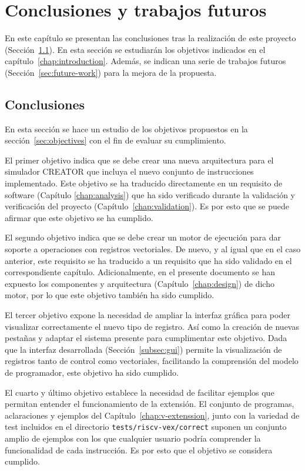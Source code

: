 \chapter{Conclusiones y trabajos futuros}\label{chap:conclusions}
En este capítulo se presentan las conclusiones tras la realización de este proyecto (Sección~\ref{sec:conclussions}). En esta sección se estudiarán los objetivos indicados en el capítulo~\ref{chap:introduction}. Además, se indican una serie de trabajos futuros (Sección~\ref{sec:future-work}) para la mejora de la propuesta.

\section{Conclusiones}\label{sec:conclussions}
En esta sección se hace un estudio de los objetivos propuestos en la sección~\ref{sec:objectives} con el fin de evaluar su cumplimiento.

El primer objetivo indica que se debe crear una nueva arquitectura para el simulador CREATOR que incluya el nuevo conjunto de instrucciones implementado. Este objetivo se ha traducido directamente en un requisito de software (Capítulo \ref{chap:analysis}) que ha sido verificado durante la validación y verificación del proyecto (Capítulo~\ref{chap:validation}). Es por esto que se puede afirmar que este objetivo se ha cumplido.

El segundo objetivo indica que se debe crear un motor de ejecución para dar soporte a operaciones con registros vectoriales. De nuevo, y al igual que en el caso anterior, este requisito se ha traducido a un requisito que ha sido validado en el correspondiente capítulo. Adicionalmente, en el presente documento se han expuesto los componentes y arquitectura (Capítulo~\ref{chap:design}) de dicho motor, por lo que este objetivo también ha sido cumplido.

El tercer objetivo expone la necesidad de ampliar la interfaz gráfica para poder visualizar correctamente el nuevo tipo de registro. Así como la creación de nuevas pestañas y adaptar el sistema presente para cumplimentar este objetivo. Dada que la interfaz desarrollada (Sección~\ref{subsec:gui}) permite la visualización de registros tanto de control como vectoriales, facilitando la comprensión del modelo de programador, este objetivo ha sido cumplido.

El cuarto y último objetivo establece la necesidad de facilitar ejemplos que permitan entender el funcionamiento de la extensión. El conjunto de programas, aclaraciones y ejemplos del Capítulo~\ref{chap:v-extenssion}, junto con la variedad de test incluidos en el directorio \texttt{tests/riscv-vex/correct} suponen un conjunto amplio de ejemplos con los que cualquier usuario podría comprender la funcionalidad de cada instrucción. Es por esto que el objetivo se considera cumplido.

